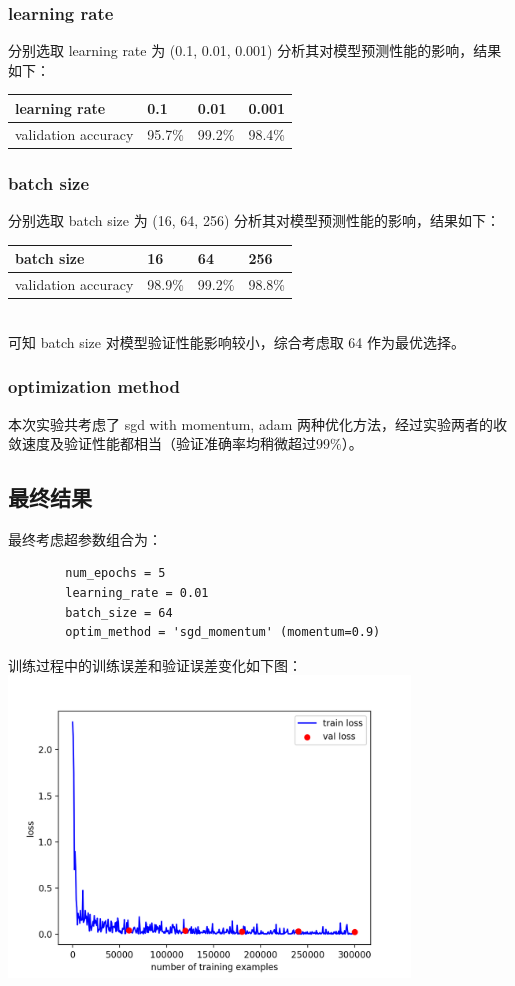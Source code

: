 \documentclass{article}
\begin{document}
	\subsubsection{learning rate}
	分别选取 learning rate 为 (0.1, 0.01, 0.001) 分析其对模型预测性能的影响，结果如下：
	\begin{table}[!htbp]
		\centering
		\begin{tabular}{|l|l|l|l|}
		\hline
		learning rate       & 0.1    & 0.01   & 0.001  \\ \hline
		validation accuracy & 95.7\% & 99.2\% & 98.4\% \\ \hline
		\end{tabular}
	\end{table}
	\subsubsection{batch size}
	分别选取 batch size 为 (16, 64, 256) 分析其对模型预测性能的影响，结果如下：
	\begin{table}[htbp]
		\centering
		\begin{tabular}{|l|l|l|l|}
		\hline
		batch size          & 16     & 64     & 256    \\ \hline
		validation accuracy & 98.9\% & 99.2\% & 98.8\% \\ \hline
		\end{tabular}
	\end{table}\\
	\indent 可知 batch size 对模型验证性能影响较小，综合考虑取 64 作为最优选择。
	\subsubsection{optimization method}
	本次实验共考虑了 sgd with momentum, adam 两种优化方法，经过实验两者的收敛速度及验证性能都相当（验证准确率均稍微超过99\%）。
	
	\subsection{最终结果}
	最终考虑超参数组合为：
	\begin{lstlisting}
		num_epochs = 5
		learning_rate = 0.01
		batch_size = 64
		optim_method = 'sgd_momentum' (momentum=0.9)
	\end{lstlisting}
	\quad\quad 训练过程中的训练误差和验证误差变化如下图：\\
	\indent \includegraphics[width = 0.8\textwidth]{loss-result.png}\\
\end{document}
